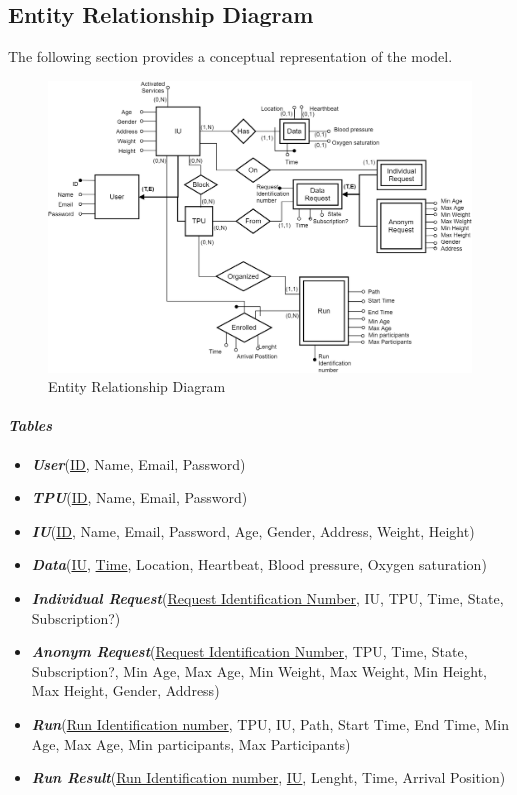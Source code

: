 \subsection{Entity Relationship Diagram}
The following section provides a conceptual representation of the model.
\begin{figure}[H]
\caption{Entity Relationship Diagram}
\centering
\includegraphics[width = \textwidth]{sections/architecturalDesign/entityRelationshipDiagram.png}
\end{figure}
\paragraph{\textit{Tables}} 
\begin{itemize}
\item \textbf{\textit{User}}(\underline{ID}, Name, Email, Password)
\item \textbf{\textit{TPU}}(\underline{ID}, Name, Email, Password)
\item \textbf{\textit{IU}}(\underline{ID}, Name, Email, Password, Age, Gender, Address, Weight, Height)
\item \textbf{\textit{Data}}(\underline{IU}, \underline{Time}, Location, Heartbeat, Blood pressure, Oxygen saturation)
\\
\item \textbf{\textit{Individual Request}}(\underline{Request Identification Number}, IU, TPU, Time, State, Subscription?)
\item \textbf{\textit{Anonym Request}}(\underline{Request Identification Number}, TPU, Time, State, Subscription?, Min Age, Max Age, Min Weight, Max Weight, Min Height, Max Height, Gender, Address)
\\
\item \textbf{\textit{Run}}(\underline{Run Identification number}, TPU, IU, Path, Start Time, End Time, Min Age, Max Age, Min participants, Max Participants)
\item \textbf{\textit{Run Result}}(\underline{Run Identification number}, \underline{IU}, Lenght, Time, Arrival Position)
\end{itemize}
